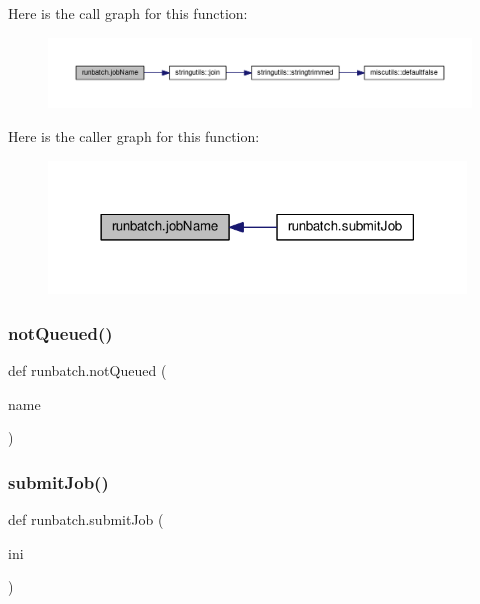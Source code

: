 Here is the call graph for this function\+:
\nopagebreak
\begin{figure}[H]
\begin{center}
\leavevmode
\includegraphics[width=350pt]{namespacerunbatch_af5b0020e591d211b50a7a8254783847a_cgraph}
\end{center}
\end{figure}
Here is the caller graph for this function\+:
\nopagebreak
\begin{figure}[H]
\begin{center}
\leavevmode
\includegraphics[width=314pt]{namespacerunbatch_af5b0020e591d211b50a7a8254783847a_icgraph}
\end{center}
\end{figure}
\mbox{\label{namespacerunbatch_a818669a56711afa7a624e689e4beb4af}} 
\subsubsection{\texorpdfstring{not\+Queued()}{notQueued()}}
{\footnotesize\ttfamily def runbatch.\+not\+Queued (\begin{DoxyParamCaption}\item[{}]{name }\end{DoxyParamCaption})}

\mbox{\label{namespacerunbatch_a83ac3b0265b97b5bf1251f0041ada563}} 
\subsubsection{\texorpdfstring{submit\+Job()}{submitJob()}}
{\footnotesize\ttfamily def runbatch.\+submit\+Job (\begin{DoxyParamCaption}\item[{}]{ini }\end{DoxyParamCaption})}



